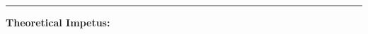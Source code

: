 \documentclass[12pt,letterpaper,doublespace, oneside]{article}
\begin{document}










\noindent\rule{\linewidth}{0.4pt}

\noindent\textbf{Theoretical Impetus:} 



\newpage


\end{document}
